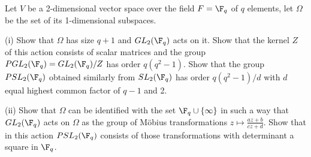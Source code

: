
\begin{problem}
Let $V$ be a 2-dimensional vector space over the field $F = \F_q$ of $q$ elements, let $\Omega$ be the set of its 1-dimensional subspaces.
\ben
\item [(i)] Show that $\Omega$ has size $q + 1$ and $GL_2(\F_q)$ acts on it. Show that the kernel $Z$ of this action consists of scalar matrices and the group $PGL_2(\F_q) = GL_2(\F_q)/Z$ has order $q(q^2-1)$. Show that the group $PSL_2(\F_q)$ obtained similarly from $SL_2(\F_q)$ has order $q(q^2 - 1)/d$ with $d$ equal highest common factor of $q - 1$ and 2.
\item [(ii)] Show that $\Omega$ can be identified with the set $\F_q \cup\{\infty\}$ in such a way that $GL_2(\F_q)$ acts on $\Omega$ as the
group of M\"obius transformations $z \mapsto \frac{az+b}{cz+d}$. Show that in this action $PSL_2(\F_q)$ consists of those transformations with determinant a square in $\F_q$.
\een
\end{problem}

